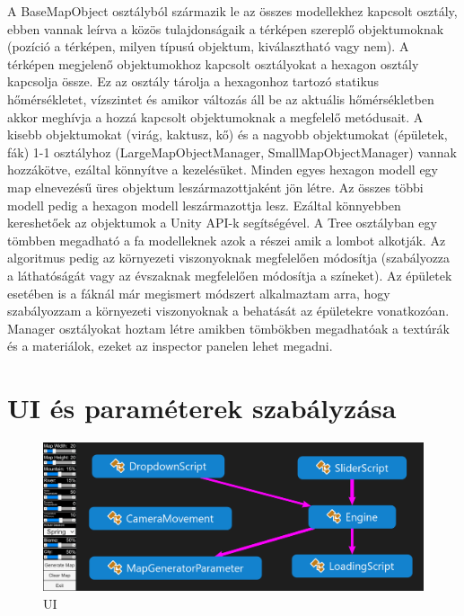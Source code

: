 A BaseMapObject osztályból származik le az összes modellekhez kapcsolt osztály, ebben vannak leírva a közös tulajdonságaik a térképen szereplő objektumoknak (pozíció a térképen, milyen típusú objektum, kiválasztható vagy nem). A térképen megjelenő objektumokhoz kapcsolt osztályokat a hexagon osztály kapcsolja össze. Ez az osztály tárolja  a hexagonhoz tartozó statikus hőmérsékletet, vízszintet és amikor változás áll be az aktuális hőmérsékletben akkor meghívja a hozzá kapcsolt objektumoknak a megfelelő metódusait. A kisebb objektumokat (virág, kaktusz, kő) és a nagyobb objektumokat (épületek, fák) 1-1 osztályhoz (LargeMapObjectManager, SmallMapObjectManager) vannak hozzákötve, ezáltal könnyítve a kezelésüket.
\newline
\newline Minden egyes hexagon modell egy map elnevezésű üres objektum leszármazottjaként jön létre. Az összes többi modell pedig a hexagon modell leszármazottja lesz. Ezáltal könnyebben kereshetőek az objektumok a Unity API-k segítségével.
\newline
\newline A Tree osztályban egy tömbben megadható a fa modelleknek azok a részei amik a lombot alkotják. Az algoritmus pedig az környezeti viszonyoknak megfelelően módosítja (szabályozza a láthatóságát vagy az évszaknak megfelelően módosítja a színeket).
\newline
\newline Az épületek esetében is a fáknál már megismert módszert alkalmaztam arra, hogy szabályozzam a környezeti viszonyoknak a behatását az épületekre vonatkozóan.
\newline
\newline Manager osztályokat hoztam létre amikben tömbökben megadhatóak a textúrák és a materiálok, ezeket az inspector panelen lehet megadni.

\newpage
\section{UI és paraméterek szabályzása}

\begin{figure}[h!]
\centering
\includegraphics[scale=0.37]{kepek/UI.png}
\caption{UI}
\label{fig:UI}
\end{figure}

